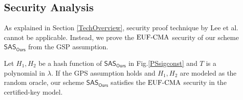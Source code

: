 \documentclass[a4paper,11pt]{fullverllncs}
\newcommand{\Ours}{\mathsf{Ours}}
\newcommand{\rmEUFCMA}{\mathrm{EUF}\mathchar`-\mathrm{CMA}}
\newcommand{\SAS}{\mathsf{SAS}}
\begin{document}
\subsection{Security Analysis}\label{OurSchemeProof}
As explained in Section \ref{TechOverview}, security proof technique by Lee et al. \cite{LLY13} cannot be applicable.
Instead, we prove  the $\rmEUFCMA$ security of our scheme $\SAS_{\Ours}$ from the GSP assumption.

\begin{theorem}\label{MCLSyncASEUFCMA}
Let $H_1, H_2$ be a hash function of $\SAS_{\Ours}$ in Fig.\ref{PSsigconst} and $T$ is a polynomial in $\lambda$.
If the GPS assumption holds and $H_1, H_2$ are modeled as the random oracle, our scheme $\SAS_{\Ours}$ satisfies the $\rmEUFCMA$ security in the certified-key model.
\end{theorem}
\end{document}
